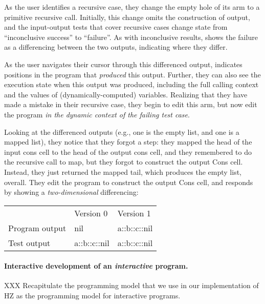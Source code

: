 {As the user identifies a recursive case, they change the empty hole of
its arm to a primitive recursive call.
%
Initially, this change omits the construction of output, and the
input-output tests that cover recursive cases change state from
``inconclusive success'' to ``failure''.
%
As with inconclusive results, \Hazel shows the failure as a
differencing between the two outputs, indicating where they differ.

As the user navigates their cursor through this differenced output,
\Hazel indicates positions in the program that \emph{produced} this
output.
%
Further, they can also see the execution state when this output was
produced, including the full calling context and the values of
(dynamically-computed) variables.
%
Realizing that they have made a mistake in their recursive case, they
begin to edit this arm, but now edit the program \emph{in the dynamic
  context of the failing test case}.

Looking at the differenced outputs (e.g., one is the empty list, and
one is a mapped list), they notice that they forgot a step: they
mapped the head of the input cons cell to the head of the output cons
cell, and they remembered to do the recursive call to map, but they
forgot to construct the output Cons cell. Instead, they just returned
the mapped tail, which produces the empty list, overall.
%
They edit the program to construct the output Cons cell, and \Hazel
responds by showing a \emph{two-dimensional} differencing:

\begin{tabular}{lll}
                & Version 0 & Version 1
\\
Program output & nil          & a::b::c::nil
\\
Test output    & a::b::c::nil & a::b::c::nil
\end{tabular}


\paragraph{Interactive development of an \emph{interactive} program.}

XXX
Recapitulate the programming model that we use in our implementation
of HZ as the programming model for interactive programs.

}
